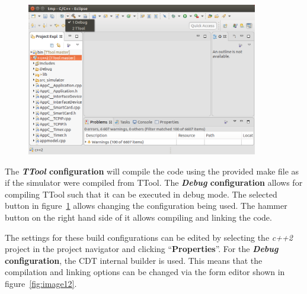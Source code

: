 \documentclass[12pt]{article}
\begin{document}
\begin{figure}[H]
\begin{center}
\includegraphics[width=0.9\textwidth, height=0.38\textheight]{images/image12.png}
\end{center}
\caption{}
\label{fig:image11}
\end{figure}

The \textbf{\textit{TTool} configuration} will compile the code using the provided make
file as if the simulator were compiled from TTool. The \textbf{\textit{Debug}
configuration} allows for compiling TTool such that it can be executed in debug
mode. The selected button in figure~\ref{fig:image11} allows changing the configuration being
used. The hammer button on the right hand side of it allows compiling and
linking the code.

The settings for these build configurations can be edited by selecting the
\textit{c++2} project in the project navigator and clicking
``\textbf{Properties}''. For the \textbf{\textit{Debug} configuration}, the CDT internal builder
is used. This means that the compilation and linking options can be changed via
the form editor shown in figure~\ref{fig:image12}.
\end{document}
